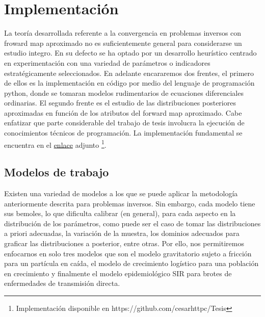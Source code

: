 \chapter{Implementación} 


La teoría desarrollada referente a la convergencia en problemas inversos con froward map aproximado no es suficientemente general para considerarse un estudio integro. En su defecto se ha optado por un desarrollo heurístico centrado en experimentación con una variedad de parámetros o indicadores estratégicamente seleccionados. En adelante encararemos dos frentes, el primero de ellos es la implementación en código por medio del lenguaje de programación python, donde se tomaran modelos rudimentarios de ecuaciones diferenciales ordinarias. El segundo frente es el estudio de las distribuciones posteriores aproximadas en función de los atributos del forward map aproximado. Cabe enfatizar que parte considerable del trabajo de tesis involucra la ejecución de conocimientos técnicos de programación. La implementación fundamental se encuentra en el \href{https://github.com/cesarhttpc/Tesis}{enlace} adjunto \footnote{Implementación disponible en https://github.com/cesarhttpc/Tesis}.





\section{Modelos de trabajo}

Existen una variedad de modelos a los que se puede aplicar la metodología anteriormente descrita para problemas inversos. Sin embargo, cada modelo tiene sus bemoles, lo que dificulta calibrar (en general), para cada aspecto en la distribución de los parámetros, como puede ser el caso de tomar las distribuciones a priori adecuadas, la variación de la muestra, los dominios adecuados para graficar las distribuciones a posterior, entre otras. Por ello, nos permitiremos enfocarnos en solo tres modelos que son el modelo gravitatorio sujeto a fricción para un partícula en caída, el modelo de crecimiento logístico para una población en crecimiento y finalmente el modelo epidemiológico SIR para brotes de enfermedades de transmisión directa.


